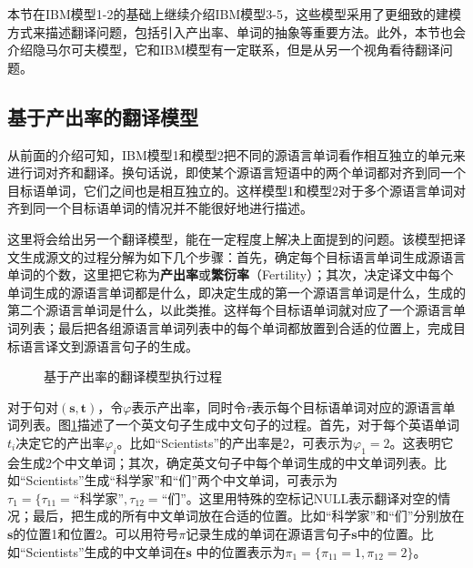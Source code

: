 \parinterval 本节在IBM模型1-2的基础上继续介绍IBM模型3-5，这些模型采用了更细致的建模方式来描述翻译问题，包括引入产出率、单词的抽象等重要方法。此外，本节也会介绍隐马尔可夫模型，它和IBM模型有一定联系，但是从另一个视角看待翻译问题。


\subsection{基于产出率的翻译模型}

\parinterval 从前面的介绍可知，IBM模型1和模型2把不同的源语言单词看作相互独立的单元来进行词对齐和翻译。换句话说，即使某个源语言短语中的两个单词都对齐到同一个目标语单词，它们之间也是相互独立的。这样模型1和模型2对于多个源语言单词对齐到同一个目标语单词的情况并不能很好地进行描述。

\parinterval 这里将会给出另一个翻译模型，能在一定程度上解决上面提到的问题。该模型把译文生成源文的过程分解为如下几个步骤：首先，确定每个目标语言单词生成源语言单词的个数，这里把它称为{\small\sffamily\bfseries{产出率}}或{\small\sffamily\bfseries{繁衍率}}（Fertility）；其次，决定译文中每个单词生成的源语言单词都是什么，即决定生成的第一个源语言单词是什么，生成的第二个源语言单词是什么，以此类推。这样每个目标语单词就对应了一个源语言单词列表；最后把各组源语言单词列表中的每个单词都放置到合适的位置上，完成目标语言译文到源语言句子的生成。

\begin{figure}[htp]
    \centering

   \caption{基于产出率的翻译模型执行过程}
   \label{fig:3-29}
\end{figure}

\parinterval 对于句对$(\mathbf{s},\mathbf{t})$，令$\varphi$表示产出率，同时令${\tau}$表示每个目标语单词对应的源语言单词列表。图{\ref{fig:3-29}}描述了一个英文句子生成中文句子的过程。首先，对于每个英语单词$t_i$决定它的产出率$\varphi_{i}$。比如``Scientists''的产出率是2，可表示为${\varphi}_{1}=2$。这表明它会生成2个中文单词；其次，确定英文句子中每个单词生成的中文单词列表。比如``Scientists''生成``科学家''和``们''两个中文单词，可表示为${\tau}_1=\{{\tau}_{11}=\textrm{``科学家''},{\tau}_{12}=\textrm{``们''}$。这里用特殊的空标记NULL表示翻译对空的情况；最后，把生成的所有中文单词放在合适的位置。比如``科学家''和``们''分别放在$\mathbf{s}$的位置1和位置2。可以用符号$\pi$记录生成的单词在源语言句子$\mathbf{s}$中的位置。比如``Scientists''生成的中文单词在$\mathbf{s}$ 中的位置表示为${\pi}_{1}=\{{\pi}_{11}=1,{\pi}_{12}=2\}$。

